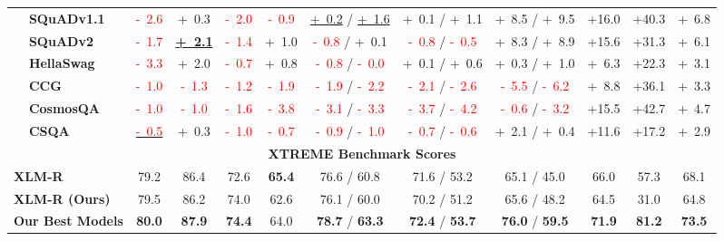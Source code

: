 \documentclass[11pt,a4paper]{article}
\newcommand{\green}[1]{\textcolor{OliveGreen}{#1}}
\newcommand{\red}[1]{\textcolor{red}{#1}}
\begin{document}
\begin{table*}[t!]
{\begin{tabular}{ll ccccccccc c}
& \textbf{SQuADv1.1} &   \red{-\ 2.6}   &   \green{+\ 0.3}   &   \red{-\ 2.0}   &   \red{-\ 0.9}   &   \underline{\green{+\ 0.2}} / \underline{\green{+\ 1.6}}   &   \green{+\ 0.1} / \green{+\ 1.1}   &   \green{+\ 8.5} / \green{+\ 9.5}   &   \green{+16.0}   &   \green{+40.3}   &   \green{+\ 6.8}  \\
& \textbf{SQuADv2} &   \red{-\ 1.7}   &   \underline{\green{\bf +\ 2.1}}   &   \red{-\ 1.4}   &   \green{+\ 1.0}   &   \red{-\ 0.8} / \green{+\ 0.1}   &   \red{-\ 0.8} / \red{-\ 0.5}   &   \green{+\ 8.3} / \green{+\ 8.9}   &   \green{+15.6}   &   \green{+31.3}   &   \green{+\ 6.1}  \\
& \textbf{HellaSwag} &   \red{-\ 3.3}   &   \green{+\ 2.0}   &   \red{-\ 0.7}   &   \green{+\ 0.8}   &   \red{-\ 0.8} / \red{-\ 0.0}   &   \green{+\ 0.1} / \green{+\ 0.6}   &   \green{+\ 0.3} / \green{+\ 1.0}   &   \green{+\ 6.3}   &   \green{+22.3}   &   \green{+\ 3.1}  \\
& \textbf{CCG} &   \red{-\ 1.0}   &   \red{-\ 1.3}   &   \red{-\ 1.2}   &   \red{-\ 1.9}   &   \red{-\ 1.9} / \red{-\ 2.2}   &   \red{-\ 2.1} / \red{-\ 2.6}   &   \red{-\ 5.5} / \red{-\ 6.2}   &   \green{+\ 8.8}   &   \green{+36.1}   &   \green{+\ 3.3}  \\
& \textbf{CosmosQA} &   \red{-\ 1.0}   &   \red{-\ 1.0}   &   \red{-\ 1.6}   &   \red{-\ 3.8}   &   \red{-\ 3.1} / \red{-\ 3.3}   &   \red{-\ 3.7} / \red{-\ 4.2}   &   \red{-\ 0.6} / \red{-\ 3.2}   &   \green{+15.5}   &   \green{+42.7}   &   \green{+\ 4.7}  \\
& \textbf{CSQA} &   \underline{\red{-\ 0.5}}   &   \green{+\ 0.3}   &   \red{-\ 1.0}   &   \red{-\ 0.7}   &   \red{-\ 0.9} / \red{-\ 1.0}   &   \red{-\ 0.7} / \red{-\ 0.6}   &   \green{+\ 2.1} / \green{+\ 0.4}   &   \green{+11.6}   &   \green{+17.2}   &   \green{+\ 2.9}  \\
\midrule
\midrule
\multicolumn{12}{c}{\bf XTREME Benchmark Scores}\\
\midrule
\multicolumn{2}{l}{{\bf XLM-R \citep{hu2020xtreme}}} & 79.2 &  86.4 &  72.6 &  \textbf{65.4} &  76.6 / 60.8   &  71.6 / 53.2 &  65.1 / 45.0  & 66.0 & 57.3 & 68.1\\
\multicolumn{2}{l}{{\bf XLM-R (Ours)}} &   79.5   &   86.2   &   74.0   &   62.6   &   76.1 / 60.0   &   70.2 / 51.2   &   65.6 / 48.2   &   64.5   &   31.0   &   64.8  \\
\multicolumn{2}{l}{{\bf Our Best Models}} &   {\bf 80.0}   &   {\bf 87.9}   &   {\bf 74.4}   &   64.0   &   {\bf 78.7} / {\bf 63.3}   &   {\bf 72.4} / {\bf 53.7}   &   {\bf 76.0} / {\bf 59.5}   &   {\bf 71.9}   &   {\bf 81.2}   &   {\bf 73.5}  \\

\end{tabular}}
\end{table*}
\end{document}
